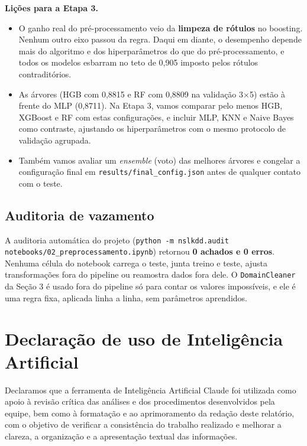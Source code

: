 \documentclass[11pt,a4paper]{article}
\begin{document}
\textbf{Lições para a Etapa 3.}
\begin{itemize}
\item O ganho real do pré-processamento veio da \textbf{limpeza de rótulos} no boosting. Nenhum outro eixo passou da regra. Daqui em diante, o desempenho depende mais do algoritmo e dos hiperparâmetros do que do pré-processamento, e todos os modelos esbarram no teto de 0,905 imposto pelos rótulos contraditórios.
\item As árvores (HGB com 0,8815 e RF com 0,8809 na validação 3$\times$5) estão à frente do MLP (0,8711). Na Etapa 3, vamos comparar pelo menos HGB, XGBoost e RF com estas configurações, e incluir MLP, KNN e Naive Bayes como contraste, ajustando os hiperparâmetros com o mesmo protocolo de validação agrupada.
\item Também vamos avaliar um \emph{ensemble} (voto) das melhores árvores e congelar a configuração final em \texttt{results/final\_config.json} antes de qualquer contato com o teste.
\end{itemize}

\subsection*{Auditoria de vazamento}

A auditoria automática do projeto (\texttt{python -m nslkdd.audit notebooks/02\_preprocessamento.ipynb}) retornou \textbf{0 achados e 0 erros}. Nenhuma célula do notebook carrega o teste, junta treino e teste, ajusta transformações fora do pipeline ou reamostra dados fora dele. O \texttt{DomainCleaner} da Seção 3 é usado fora do pipeline só para contar os valores impossíveis, e ele é uma regra fixa, aplicada linha a linha, sem parâmetros aprendidos.

\section*{Declaração de uso de Inteligência Artificial}

Declaramos que a ferramenta de Inteligência Artificial Claude
foi utilizada como apoio à revisão crítica das análises e
dos procedimentos desenvolvidos pela equipe, bem como à
formatação e ao aprimoramento da redação deste relatório,
com o objetivo de verificar a consistência do trabalho
realizado e melhorar a clareza, a organização e a
apresentação textual das informações.
\end{document}

